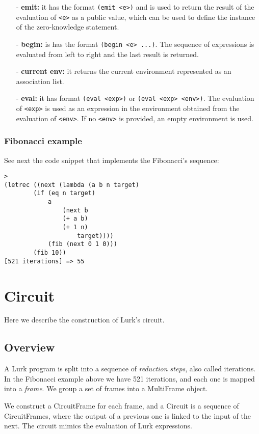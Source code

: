 \documentclass[10pt, english]{article}
\begin{document}
\begin{itemize}
  \item[-] \textbf{emit:} it has the format \verb|(emit <e>)| and is used to return the result of the evaluation of \verb|<e>| as a public value, which can be used to define the instance of the zero-knowledge statement.
  \item[-] \textbf{begin:} is has the format \verb|(begin <e> ...)|. The sequence of expressions is evaluated from left to right and the last result is returned.
  \item[-] \textbf{current env:} it returns the current environment represented as an association list.
  \item[-] \textbf{eval:} it has format \verb|(eval <exp>)| or \verb|(eval <exp> <env>)|. The evaluation of \verb|<exp>| is used as an expression in the environment obtained from the evaluation of \verb|<env>|. If no \verb|<env>| is provided, an empty environment is used.
\end{itemize}

\subsubsection{Fibonacci example}

See next the code snippet that implements the Fibonacci's sequence:

\begin{verbatim}
>
(letrec ((next (lambda (a b n target)
        (if (eq n target)
            a
                (next b
                (+ a b)
                (+ 1 n)
                    target))))
            (fib (next 0 1 0)))
        (fib 10))
[521 iterations] => 55
\end{verbatim}

\section{Circuit}

Here we describe the construction of Lurk's circuit.

\subsection{Overview}

A Lurk program is split into a sequence of \textit{reduction steps}, also called iterations. In the Fibonacci example above we have 521 iterations, and each one is mapped into a \textit{frame}. We group a set of frames into a MultiFrame object.

We construct a CircuitFrame for each frame, and a Circuit is a sequence of CircuitFrames, where the output of a previous one is linked to the input of the next. The circuit mimics the evaluation of Lurk expressions.
\end{document}
